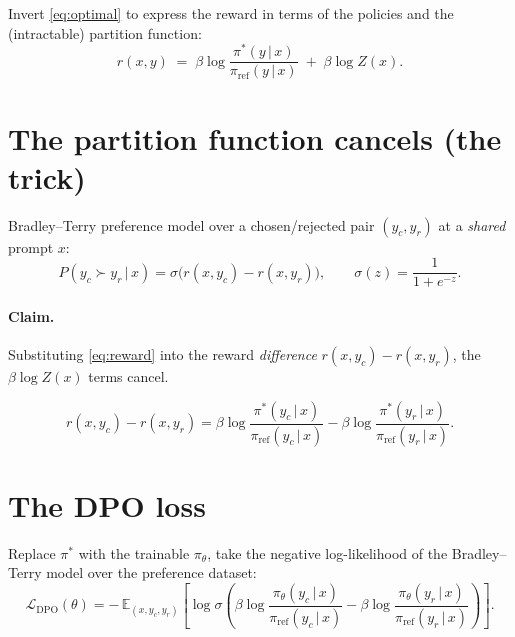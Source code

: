 \documentclass[11pt]{article}
\newcommand{\pit}{\pi_\theta}
\newcommand{\piref}{\pi_{\text{ref}}}
\newcommand{\given}{\,\vert\,}
\newcommand{\E}{\mathbb{E}}
\begin{document}
Invert \eqref{eq:optimal} to express the reward in terms of the policies
and the (intractable) partition function:
\begin{equation}
  r(x,y) \;=\;
  \beta \log \frac{\pi^*(y \given x)}{\piref(y \given x)}
  \;+\; \beta \log Z(x).
  \label{eq:reward}
\end{equation}


\section{The partition function cancels (the trick)}

Bradley--Terry preference model over a chosen/rejected pair
$(y_c, y_r)$ at a \emph{shared} prompt $x$:
\begin{equation}
  P(y_c \succ y_r \given x)
  = \sigma\!\big( r(x, y_c) - r(x, y_r) \big),
  \qquad \sigma(z) = \frac{1}{1+e^{-z}}.
  \label{eq:bt}
\end{equation}

\paragraph{Claim.} Substituting \eqref{eq:reward} into the reward
\emph{difference} $r(x,y_c) - r(x,y_r)$, the $\beta \log Z(x)$ terms cancel.


\begin{equation}
  r(x,y_c) - r(x,y_r)
  = \beta \log \frac{\pi^*(y_c \given x)}{\piref(y_c \given x)}
  - \beta \log \frac{\pi^*(y_r \given x)}{\piref(y_r \given x)}.
  \label{eq:rewarddiff}
\end{equation}

\section{The DPO loss}

Replace $\pi^*$ with the trainable $\pit$, take the negative log-likelihood
of the Bradley--Terry model over the preference dataset:
\begin{equation}
  \mathcal{L}_{\text{DPO}}(\theta)
  = -\,\E_{(x, y_c, y_r)}
  \left[
    \log \sigma\!\left(
      \beta \log \frac{\pit(y_c \given x)}{\piref(y_c \given x)}
      - \beta \log \frac{\pit(y_r \given x)}{\piref(y_r \given x)}
    \right)
  \right].
  \label{eq:dpoloss}
\end{equation}
\end{document}
